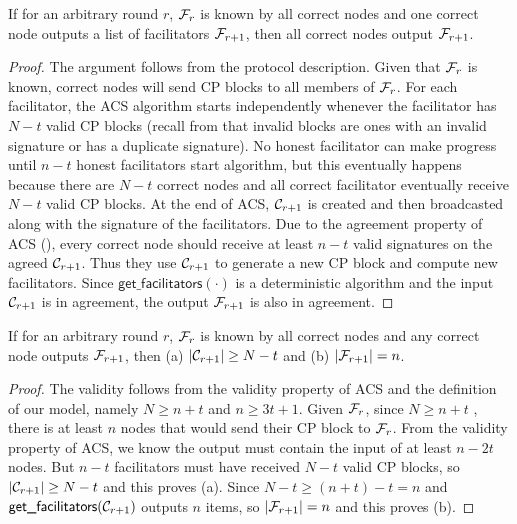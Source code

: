 \begin{lemma}
\label{lemma:agreement}
If for an arbitrary round $r$,
$\mathcal{F}_{r}$ is known by all correct nodes and one correct node outputs a list of facilitators $\mathcal{F}_{r+1}$,
then all correct nodes output $\mathcal{F}_{r+1}$.
\end{lemma}
\begin{proof}
The argument follows from the protocol description.
Given that $\mathcal{F}_r$ is known,
correct nodes will send CP blocks to all members of $\mathcal{F}_r$.
For each facilitator, the ACS algorithm starts independently whenever the facilitator has $N - t$ valid CP blocks
(recall from  that invalid blocks are ones with an invalid signature or has a duplicate signature).
No honest facilitator can make progress until $n-t$ honest facilitators start algorithm,
but this eventually happens because there are $N - t$ correct nodes and all correct facilitator eventually receive $N -t$ valid CP blocks.
At the end of ACS, $\mathcal{C}_{r+1}$ is created and then broadcasted along with the signature of the facilitators.
Due to the agreement property of ACS (),
every correct node should receive at least $n - t$ valid signatures on the agreed $\mathcal{C}_{r+1}$.
Thus they use $\mathcal{C}_{r+1}$ to generate a new CP block and compute new facilitators.
Since $\textsf{get\_facilitators}(\cdot)$ is a deterministic algorithm and the input $\mathcal{C}_{r+1}$ is in agreement, the output $\mathcal{F}_{r+1}$ is also in agreement.
\end{proof}

\begin{lemma}
\label{lemma:validity}
If for an arbitrary round $r$,
$\mathcal{F}_r$ is known by all correct nodes and any correct node outputs $\mathcal{F}_{r+1}$,
then (a) $|\mathcal{C}_{r+1}| \ge N - t$ and (b) $|\mathcal{F}_{r+1}| = n$.
\end{lemma}
\begin{proof}
The validity follows from the validity property of ACS and the definition of our model,
namely $N \ge n + t$ and $n \ge 3t + 1$.
Given $\mathcal{F}_r$, since $N \ge n + t$ , there is at least $n$ nodes that would send their CP block to $\mathcal{F}_r$.
From the validity property of ACS, we know the output must contain the input of at least $n - 2t$ nodes.
But $n -t$ facilitators must have received $N - t$ valid CP blocks, so $|\mathcal{C}_{r+1}| \ge N-t$ and this proves (a).
Since $N-t \ge (n+t) -t = n$ and $\textsf{get\_facilitators}(\mathcal{C}_{r+1})$ outputs $n$ items, so $|\mathcal{F}_{r+1}| = n$ and this proves (b).
\end{proof}


